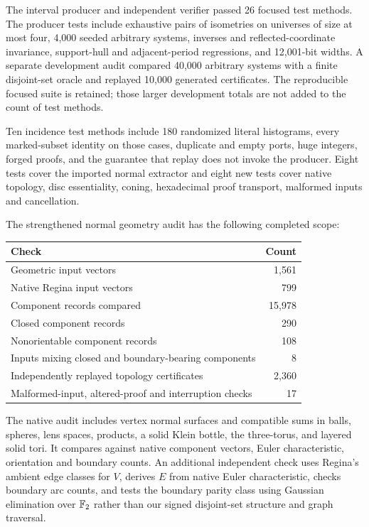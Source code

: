 The interval producer and independent verifier passed 26 focused test
methods. The producer tests include exhaustive pairs of isometries on
universes of size at most four, 4,000 seeded arbitrary systems, inverses
and reflected-coordinate invariance, support-hull and adjacent-period
regressions, and 12,001-bit widths. A separate development audit compared
40,000 arbitrary systems with a finite disjoint-set oracle and replayed
10,000 generated certificates. The reproducible focused suite is retained;
those larger development totals are not added to the count of test methods.

Ten incidence test methods include 180 randomized literal histograms,
every marked-subset identity on those cases, duplicate and empty ports,
huge integers, forged proofs, and the guarantee that replay does not
invoke the producer. Eight tests cover the imported normal extractor and
eight new tests cover native topology, disc essentiality, coning,
hexadecimal proof transport, malformed inputs and cancellation.

The strengthened normal geometry audit has the following completed scope:
\begin{center}
\begin{tabular}{@{}lr@{}}
\toprule Check & Count\\\midrule
Geometric input vectors & 1,561\\
Native Regina input vectors & 799\\
Component records compared & 15,978\\
Closed component records & 290\\
Nonorientable component records & 108\\
Inputs mixing closed and boundary-bearing components & 8\\
Independently replayed topology certificates & 2,360\\
Malformed-input, altered-proof and interruption checks & 17\\\bottomrule
\end{tabular}
\end{center}
The native audit includes vertex normal surfaces and compatible sums in
balls, spheres, lens spaces, products, a solid Klein bottle, the three-torus,
and layered solid tori. It compares against native component vectors,
Euler characteristic, orientation and boundary counts. An additional
independent check uses Regina's ambient edge classes for $V$, derives $E$
from native Euler characteristic, checks boundary arc counts, and tests
the boundary parity class using Gaussian elimination over $\mathbb F_2$ rather
than our signed disjoint-set structure and graph traversal.

